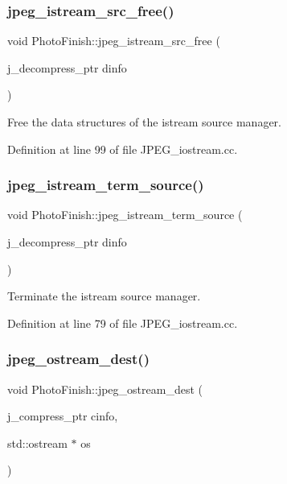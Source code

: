 \subsubsection{\texorpdfstring{jpeg\+\_\+istream\+\_\+src\+\_\+free()}{jpeg\_istream\_src\_free()}}
{\footnotesize\ttfamily void Photo\+Finish\+::jpeg\+\_\+istream\+\_\+src\+\_\+free (\begin{DoxyParamCaption}\item[{j\+\_\+decompress\+\_\+ptr}]{dinfo }\end{DoxyParamCaption})}



Free the data structures of the istream source manager. 



Definition at line 99 of file J\+P\+E\+G\+\_\+iostream.\+cc.

\mbox{\label{namespace_photo_finish_a3e8433bb81cdaea426e1c9dcf492277f}} 
\subsubsection{\texorpdfstring{jpeg\+\_\+istream\+\_\+term\+\_\+source()}{jpeg\_istream\_term\_source()}}
{\footnotesize\ttfamily void Photo\+Finish\+::jpeg\+\_\+istream\+\_\+term\+\_\+source (\begin{DoxyParamCaption}\item[{j\+\_\+decompress\+\_\+ptr}]{dinfo }\end{DoxyParamCaption})}



Terminate the istream source manager. 



Definition at line 79 of file J\+P\+E\+G\+\_\+iostream.\+cc.

\mbox{\label{namespace_photo_finish_a8d7e2916997da593705b47a56cf33ea2}} 
\subsubsection{\texorpdfstring{jpeg\+\_\+ostream\+\_\+dest()}{jpeg\_ostream\_dest()}}
{\footnotesize\ttfamily void Photo\+Finish\+::jpeg\+\_\+ostream\+\_\+dest (\begin{DoxyParamCaption}\item[{j\+\_\+compress\+\_\+ptr}]{cinfo,  }\item[{std\+::ostream $\ast$}]{os }\end{DoxyParamCaption})}



